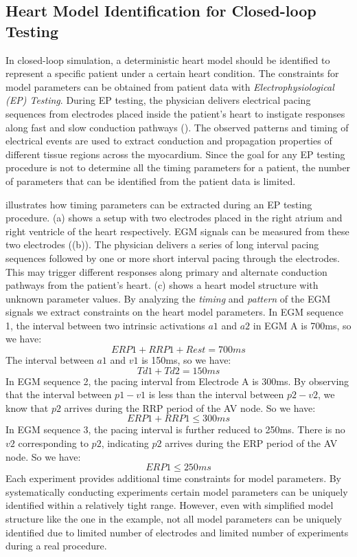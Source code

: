 \subsection{Heart Model Identification for Closed-loop Testing}
In closed-loop simulation, a deterministic heart model should be identified to represent a specific patient under a certain heart condition. The constraints for model parameters can be obtained from patient data with \emph{Electrophysiological (EP) Testing}. During EP testing, the physician delivers electrical pacing sequences from electrodes placed inside the patient's heart to instigate responses along fast and slow conduction pathways (). The observed patterns and timing of electrical events are used to extract conduction and propagation properties of different tissue regions across the myocardium. Since the goal for any EP testing procedure is not to determine all the timing parameters for a patient, the number of parameters that can be identified from the patient data is limited.    

 illustrates how timing parameters can be extracted during an EP testing procedure. (a) shows a setup with two electrodes placed in the right atrium and right ventricle of the heart respectively. EGM signals can be measured from these two electrodes ((b)). The physician delivers a series of long interval pacing sequences followed by one or more short interval pacing through the electrodes. This may trigger different responses along primary and alternate conduction pathways from the patient's heart. (c) shows a heart model structure with unknown parameter values. By analyzing the \emph{timing} and \emph{pattern} of the EGM signals we extract constraints on the heart model parameters. In EGM sequence 1, the interval between two intrinsic activations $a1$ and $a2$ in EGM A is 700ms, so we have:
$$ERP1+RRP1+Rest=700ms$$
The interval between $a1$ and $v1$ is 150ms, so we have:
$$Td1+Td2=150ms$$
In EGM sequence 2, the pacing interval from Electrode A is 300ms. By observing that the interval between $p1-v1$ is less than the interval between $p2-v2$, we know that $p2$ arrives during the RRP period of the AV node. So we have:
$$ERP1+RRP1\leq 300ms$$
In EGM sequence 3, the pacing interval is further reduced to 250ms. There is no $v2$ corresponding to $p2$, indicating $p2$ arrives during the ERP period of the AV node. So we have:
$$ERP1\leq 250ms$$
Each experiment provides additional time constraints for model parameters. By systematically conducting experiments certain model parameters can be uniquely identified within a relatively tight range. However, even with simplified model structure like the one in the example, not all model parameters can be uniquely identified due to limited number of electrodes and limited number of experiments during a real procedure.






